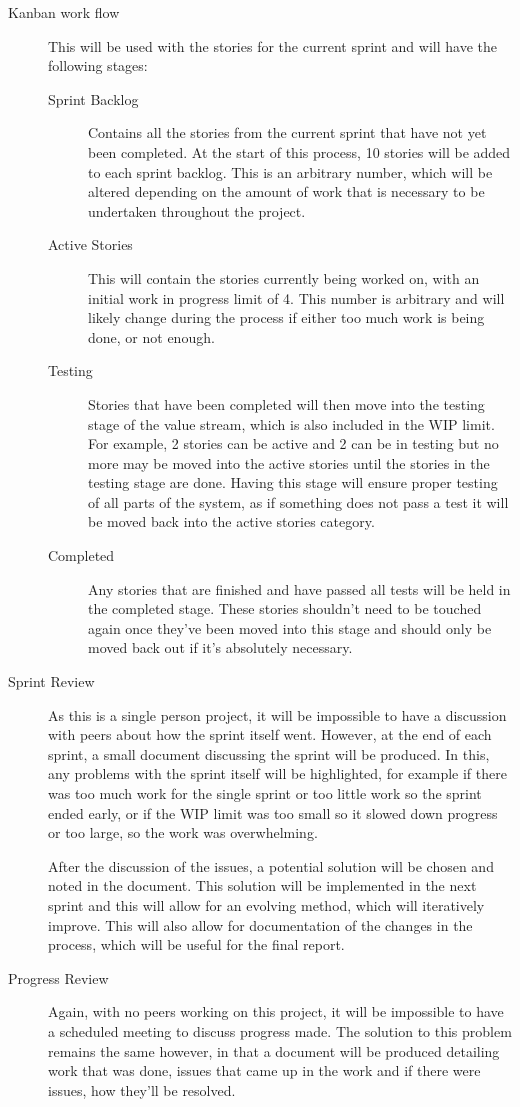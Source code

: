 \documentclass[11pt,fleqn,twoside]{article}
\begin{document}
\begin{description}
  \item[Kanban work flow]
    This will be used with the stories for the current sprint and will have the following stages:
    \begin{description}
      \item[Sprint Backlog]
        Contains all the stories from the current sprint that have not yet been completed. At the start of this process, 10 stories will be added to each sprint backlog. This is an arbitrary number, which will be altered depending on the amount of work that is necessary to be undertaken throughout the project.
      \item[Active Stories]
        This will contain the stories currently being worked on, with an initial work in progress limit of 4. This number is arbitrary and will likely change during the process if either too much work is being done, or not enough.
      \item[Testing]
        Stories that have been completed will then move into the testing stage of the value stream, which is also included in the WIP limit. For example, 2 stories can be active and 2 can be in testing but no more may be moved into the active stories until the stories in the testing stage are done. Having this stage will ensure proper testing of all parts of the system, as if something does not pass a test it will be moved back into the active stories category.
      \item[Completed]
        Any stories that are finished and have passed all tests will be held in the completed stage. These stories shouldn't need to be touched again once they've been moved into this stage and should only be moved back out if it's absolutely necessary.
    \end{description}
  \item[Sprint Review]
    As this is a single person project, it will be impossible to have a discussion with peers about how the sprint itself went. However, at the end of each sprint, a small document discussing the sprint will be produced. In this, any problems with the sprint itself will be highlighted, for example if there was too much work for the single sprint or too little work so the sprint ended early, or if the WIP limit was too small so it slowed down progress or too large, so the work was overwhelming. 
    
    After the discussion of the issues, a potential solution will be chosen and noted in the document. This solution will be implemented in the next sprint and this will allow for an evolving method, which will iteratively improve. This will also allow for documentation of the changes in the process, which will be useful for the final report.
  \item[Progress Review]
     Again, with no peers working on this project, it will be impossible to have a scheduled meeting to discuss progress made. The solution to this problem remains the same however, in that a document will be produced detailing work that was done, issues that came up in the work and if there were issues, how they'll be resolved.\\
     

\end{description}
\end{document}
